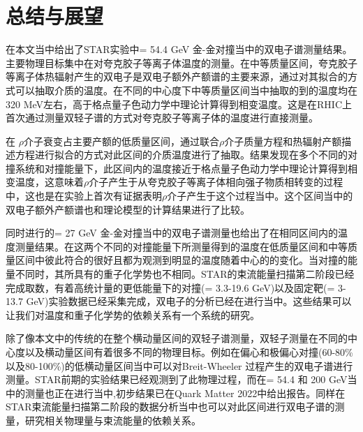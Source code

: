 

\setcounter{section}{0}

\setcounter{figure}{0}
\setcounter{table}{0}
\setcounter{equation}{0}

\chapter{总结与展望}

在本文当中给出了STAR实验中\sNN = 54.4 GeV 金-金对撞当中的双电子谱测量结果。主要物理目标集中在对夸克胶子等离子体温度的测量。在中等质量区间，夸克胶子等离子体热辐射产生的双电子是双电子额外产额谱的主要来源，通过对其拟合的方式可以抽取介质的温度。在不同的中心度下中等质量区间当中抽取的到的温度均在320 MeV左右，高于格点量子色动力学中理论计算得到相变温度。这是在RHIC上首次通过测量双轻子谱的方式对夸克胶子等离子体的温度进行直接测量。

在 $\rho$介子衰变占主要产额的低质量区间，通过联合$\rho$介子质量方程和热辐射产额描述方程进行拟合的方式对此区间的介质温度进行了抽取。结果发现在多个不同的对撞系统和对撞能量下，此区间内的温度接近于格点量子色动力学中理论计算得到相变温度，这意味着$\rho$介子产生于从夸克胶子等离子体相向强子物质相转变的过程中，这也是在实验上首次有证据表明$\rho$介子产生于这个过程当中。这个区间当中的双电子额外产额谱也和理论模型的计算结果进行了比较。

同时进行的\sNN = 27 GeV 金-金对撞当中的双电子谱测量也给出了在相同区间内的温度测量结果。在这两个不同的对撞能量下所测量得到的温度在低质量区间和中等质量区间中彼此符合的很好且都为观测到明显的温度随着中心的的变化。当对撞的能量不同时，其所具有的重子化学势也不相同。STAR的束流能量扫描第二阶段已经完成取数，有着高统计量的更低能量下的对撞(\sNN = 3.3-19.6 GeV)以及固定靶(\sNN = 3-13.7 GeV)实验数据已经采集完成，双电子的分析已经在进行当中。这些结果可以让我们对温度和重子化学势的依赖关系有一个系统的研究。

除了像本文中的传统的在整个横动量区间的双轻子谱测量，双轻子测量在不同的中心度以及横动量区间有着很多不同的物理目标。例如在偏心和极偏心对撞(60-80\%以及80-100\%)的低横动量区间当中可以对Breit-Wheeler 过程产生的双电子谱进行测量。STAR前期的实验结果已经观测到了此物理过程\cite{STAR:2019wlg, STAR:2018ldd}，而在\sNN = 54.4 和 200 GeV当中的测量也正在进行当中,初步结果已在Quark Matter 2022中给出报告。同样在STAR束流能量扫描第二阶段的数据分析当中也可以对此区间进行双电子谱的测量，研究相关物理量与束流能量的依赖关系。

